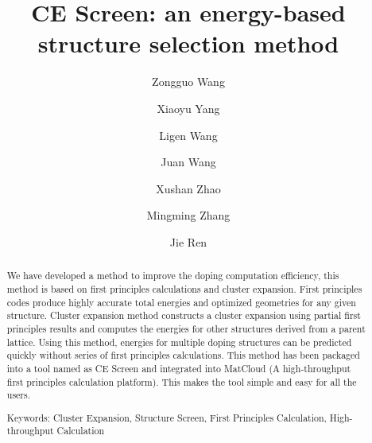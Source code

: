 \documentclass[aps,preprint,amsmath,amssymb]{revtex4}
\begin{document}
\title{CE Screen: an energy-based structure selection method}
\author{Zongguo Wang}
 
\author{Xiaoyu Yang}
\author{Ligen Wang}
\author{Juan Wang}
\author{Xushan Zhao}
\author{Mingming Zhang}
\author{Jie Ren}

\begin{abstract}
We have developed a method to improve the doping computation efficiency, this method is based on first principles calculations
and cluster expansion. First principles codes produce highly accurate total energies and optimized geometries for any given structure.
Cluster expansion method constructs a cluster expansion using partial first principles results and
computes the energies for other structures derived from a parent lattice.
Using this method, energies for multiple doping structures can be predicted quickly without series of first principles calculations.
This method has been packaged into a tool named as CE Screen and integrated into MatCloud (A high-throughput first principles calculation platform).
This makes the tool simple and easy for all the users.

Keywords: Cluster Expansion, Structure Screen, First Principles Calculation, High-throughput Calculation
\end{abstract}
\maketitle
\end{document}
